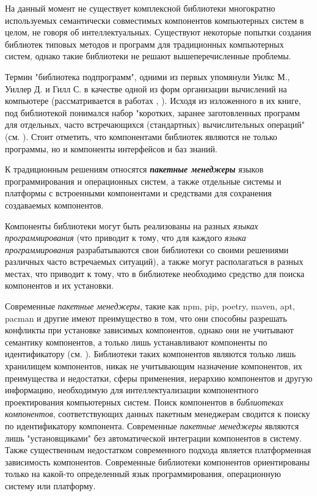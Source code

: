 На данный момент не существует комплексной библиотеки многократно используемых семантически совместимых компонентов компьютерных систем в целом, не говоря об интеллектуальных. Существуют некоторые попытки создания библиотек типовых методов и программ для традиционных компьютерных систем, однако такие библиотеки не решают вышеперечисленные проблемы.

Термин "библиотека подпрограмм"{}, одними из первых упомянули Уилкс М., Уиллер Д. и Гилл С. в качестве одной из форм организации вычислений на компьютере (рассматривается в работах , ). Исходя из изложенного в их книге, под библиотекой понимался набор "коротких, заранее заготовленных программ для отдельных, часто встречающихся (стандартных) вычислительных операций"{} (см. ). Стоит отметить, что компонентами библиотек являются не только программы, но и компоненты интерфейсов и баз знаний.

К традиционным решениям относятся \textbf{\textit{пакетные менеджеры}} языков программирования и операционных систем, а также отдельные системы и платформы с встроенными компонентами и средствами для сохранения создаваемых компонентов.

Компоненты библиотеки могут быть реализованы на разных \textit{языках программирования} (что приводит к тому, что для каждого \textit{языка программирования} разрабатываются свои библиотеки со своими решениями различных часто встречаемых ситуаций), а также могут располагаться в разных местах, что приводит к тому, что в библиотеке необходимо средство для поиска компонентов и их установки.

Современные \textit{пакетные менеджеры}, такие как npm, pip, poetry, maven, apt, pacman и другие имеют преимущество в том, что они способны разрешать конфликты при установке зависимых компонентов, однако они не учитывают семантику компонентов, а только лишь устанавливают компоненты по идентификатору (см. ). Библиотеки таких компонентов являются только лишь хранилищем компонентов, никак не учитывающим назначение компонентов, их преимущества и недостатки, сферы применения, иерархию компонентов и другую информацию, необходимую для интеллектуализации компонентного проектирования компьютерных систем. Поиск компонентов в \textit{библиотеках компонентов}, соответствующих данных пакетным менеджерам сводится к поиску по идентификатору компонента. Современные \textit{пакетные менеджеры} являются лишь "установщиками"{} без автоматической интеграции компонентов в систему. Также существенным недостатком современного подхода является платформенная зависимость компонентов. Современные библиотеки компонентов ориентированы только на какой-то определенный язык программирования, операционную систему или платформу.

